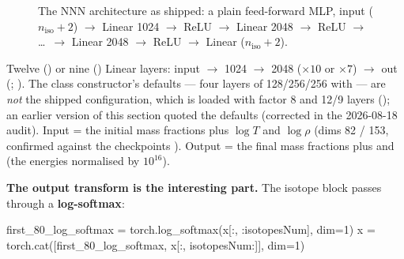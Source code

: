 \begin{figure}[H]
\centering
{}
\caption{The NNN architecture as shipped: a plain feed-forward MLP,
  input ($n_{\mathrm{iso}} + 2$) $\to$ Linear 1024 $\to$ ReLU $\to$ Linear
  2048 $\to$ ReLU $\to$ \ldots\ $\to$ Linear 2048 $\to$ ReLU $\to$ Linear
  ($n_{\mathrm{iso}} + 2$).}
\label{fig:nnnarch}
\end{figure}

Twelve () or nine () Linear layers: input $\to$ 1024 $\to$
2048 ($\times 10$ or $\times 7$) $\to$ out (\citealt[\S 2.3, Fig.~2]{grichener2025};
). The class constructor's defaults --- four
layers of 128/256/256 with  --- are
\emph{not} the shipped configuration, which is loaded with factor 8 and 12/9
layers (); an earlier version of this section
quoted the defaults (corrected in the 2026-08-18 audit). Input = the initial
mass fractions plus $\log T$ and $\log\rho$ (dims 82 / 153, confirmed against
the checkpoints ). Output = the final mass fractions
plus \enuc{} and \epsnu{} (the energies normalised by $10^{16}$).

\textbf{The output transform is the interesting part.} The isotope block
passes through a \textbf{log-softmax}:

\begin{srclisting}
first_80_log_softmax = torch.log_softmax(x[:, :isotopesNum], dim=1)
x = torch.cat([first_80_log_softmax, x[:, isotopesNum:]], dim=1)
\end{srclisting}

